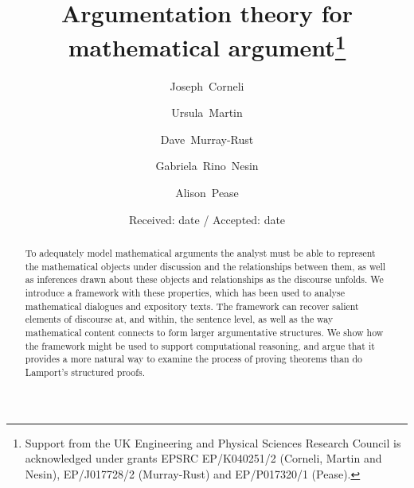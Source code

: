 \documentclass[smallextended,oneside]{svjour3}       %
\begin{document}
\title{Argumentation theory for mathematical argument\thanks{Support from the UK Engineering and Physical Sciences Research Council is acknowledged under grants EPSRC EP/K040251/2 (Corneli, Martin and Nesin), EP/J017728/2 (Murray-Rust) and EP/P017320/1 (Pease).}}

\author{Joseph~Corneli \and
        Ursula~Martin \and
        Dave~Murray-Rust \and
        Gabriela~Rino~Nesin \and
        Alison~Pease
}

\authorrunning{~}


\date{Received: date / Accepted: date}

\maketitle

\begin{abstract}
To adequately model mathematical arguments the analyst must be able to
represent the mathematical objects under discussion and the
relationships between them, as well as inferences drawn about these
objects and relationships as the discourse unfolds.
We introduce a framework with these properties, which has been 
used to analyse mathematical dialogues and expository texts.
The framework can recover salient elements of discourse at, and within, the sentence
level, as well as the way mathematical content connects to form larger
argumentative structures.  We show how the framework might be used to
support computational reasoning, and argue that it provides a more
natural way to examine the process of proving theorems than do
Lamport's structured proofs.
\end{abstract}
\end{document}
